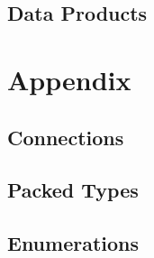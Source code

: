 \subsection{Data Products}



\section{Appendix}
\subsection{Connections}


\subsection{Packed Types}



\subsection{Enumerations}




